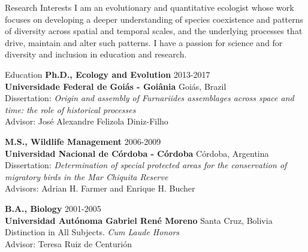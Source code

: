 \documentclass{resume} %
\begin{document}
\begin{rSection}{Research Interests}
I am an evolutionary and quantitative ecologist whose work focuses on developing a deeper understanding of species coexistence and patterns of diversity across spatial and temporal scales, and the underlying processes that drive, maintain and alter such patterns. I have a passion for science and for diversity and inclusion in education and research.

\end{rSection}


\begin{rSection}{Education}
{\bf Ph.D., Ecology and Evolution} \hfill 2013-2017 \\ 
{\bf Universidade Federal de Goiás - Goiânia} \hfill Goiás, Brazil \\
{Dissertation: \emph{Origin and assembly of Furnariides assemblages across space and time: the role of historical processes}} \\
{Advisor: José Alexandre Felizola Diniz-Filho} \smallskip 

{\bf M.S., Wildlife Management} \hfill 2006-2009 \\
{\bf Universidad Nacional de Córdoba - Córdoba} \hfill Córdoba, Argentina \\
{Dissertation: \emph{Determination of special protected areas for the conservation of migratory birds in the Mar Chiquita Reserve}} \\
{Advisors: Adrian H. Farmer and Enrique H. Bucher} \smallskip 

{\bf B.A., Biology} \hfill 2001-2005 \\
{\bf Universidad Autónoma Gabriel René Moreno} \hfill Santa Cruz, Bolivia \\
{Distinction in All Subjects. \emph{Cum Laude Honors}} \\ 
{Advisor: Teresa Ruiz de Centurión} \smallskip 
\end{rSection}

\end{document}
